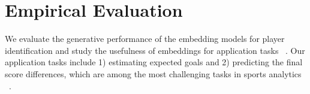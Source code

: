 \documentclass{article}
\newcommand{\latentvariables}{\mathbf{z}}
\newcommand{\inference}{q}
\newcommand{\state}{\mathbf{s}}
\newcommand{\action}{\mathbf{a}}
\newcommand{\reward}{\boldsymbol{r}}
\newcommand{\player}{pl}
\newcommand{\pindex}{i}
\newcommand{\prior}{p}
\begin{document}




\section{Empirical Evaluation} 
We evaluate the generative performance of the embedding models for player identification 
and study the usefulness of embeddings for application tasks 
~\cite{PetersNIGCLZ18,AkbikBV18}.
Our application tasks include 1) estimating expected goals and 2) predicting the final score differences, which are among the most challenging tasks in sports analytics %
~\cite{Macdonald2012,ganguly2018problem}.
\end{document}
